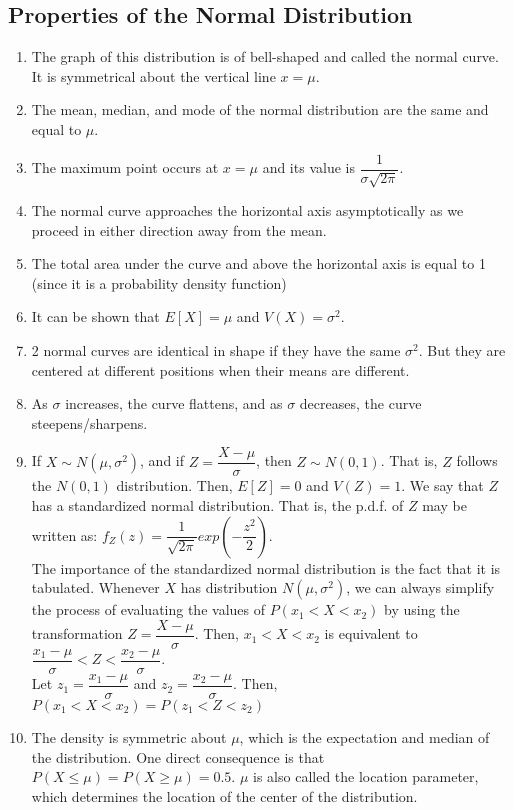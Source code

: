 \subsection{Properties of the Normal Distribution}
\begin{enumerate}
    \item The graph of this distribution is of bell-shaped and called the normal curve. It is symmetrical about the vertical line $x = \mu$.
    \item The mean, median, and mode of the normal distribution are the same and equal to $\mu$.
    \item The maximum point occurs at $x = \mu$ and its value is $\dfrac{1}{\sigma \sqrt{2\pi}}$.
    \item The normal curve approaches the horizontal axis asymptotically as we proceed in either direction away from the mean.
    \item The total area under the curve and above the horizontal axis is equal to 1 (since it is a probability density function)
    \item It can be shown that $E[X] = \mu$ and $V(X) = \sigma^2$.
    \item 2 normal curves are identical in shape if they have the same $\sigma^2$. But they are centered at different positions when their means are different.
    \item As $\sigma$ increases, the curve flattens, and as $\sigma$ decreases, the curve steepens/sharpens.
    \item If $X \sim N(\mu, \sigma^2)$, and if $Z = \dfrac{X - \mu}{\sigma}$, then $Z \sim N(0,1)$. That is, $Z$ follows the $N(0,1)$ distribution. Then, $E[Z] = 0$ and $V(Z) = 1$. We say that $Z$ has a standardized normal distribution. That is, the p.d.f. of $Z$ may be written as: $f_Z(z) = \dfrac{1}{\sqrt{2\pi}} exp\left( - \dfrac{z^2}{2}\right)$. \\
    The importance of the standardized normal distribution is the fact that it is tabulated. Whenever $X$ has distribution $N(\mu,\sigma^2)$, we can always simplify the process of evaluating the values of $P(x_1 < X < x_2)$ by using the transformation $Z = \dfrac{X - \mu}{\sigma}$. Then,
    $x_1 < X < x_2$ is equivalent to $\dfrac{x_1 - \mu }{\sigma} < Z < \dfrac{x_2 - \mu }{\sigma}$. \\
    Let $z_1 = \dfrac{x_1 - \mu }{\sigma}$ and $z_2 = \dfrac{x_2 - \mu }{\sigma}$. Then, $P(x_1 < X < x_2) = P(z_1 < Z < z_2)$
    \item The density is symmetric about $\mu$, which is the expectation and median of the distribution. One direct consequence is that $P(X \leq \mu) = P(X \geq \mu) = 0.5$. $\mu$ is also called the location parameter, which determines the location of the center of the distribution.

\end{enumerate}

